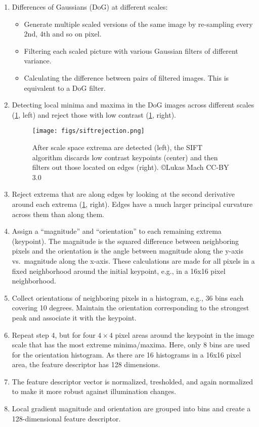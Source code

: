 \begin{enumerate}
\item Differences of Gaussians (DoG) at different scales:
\begin{itemize}
\item Generate multiple scaled versions of the same image by re-sampling every 2nd, 4th and so on pixel.
\item Filtering each scaled picture with various Gaussian filters of different variance.
\item Calculating the difference between pairs of filtered images. This is equivalent to a DoG filter.
\end{itemize}

\item Detecting local minima and maxima in the DoG images across different scales (\cref{fig:siftrejection}, left) and reject those with low contrast (\cref{fig:siftrejection}, right).

\begin{figure}
	\centering
	\texttt{[image: figs/siftrejection.png]}
	\caption{After scale space extrema are detected (left), the SIFT algorithm discards low contrast keypoints (center) and then filters out those located on edges (right). \copyright Lukas Mach CC-BY 3.0}
	\label{fig:siftrejection}
\end{figure}

\item Reject extrema that are along edges by looking at the second derivative around each extrema (\cref{fig:siftrejection}, right). Edges have a much larger principal curvature across them than along them.
\item Assign a ``magnitude'' and ``orientation'' to each remaining extrema (keypoint). The magnitude is the squared difference between neighboring pixels and the orientation is the angle between magnitude along the y-axis vs.\ magnitude along the x-axis. These calculations are made for all pixels in a fixed neighborhood around the initial keypoint, e.g., in a 16x16 pixel neighborhood.
\item Collect orientations of neighboring pixels in a histogram, e.g., 36 bins each covering 10 degrees. Maintain the orientation corresponding to the strongest peak and associate it with the keypoint.
\item Repeat step 4, but for four $4\times4$ pixel areas around the keypoint in the image scale that has the most extreme minima/maxima. Here, only 8 bins are used for the orientation histogram. As there are 16 histograms in a 16x16 pixel area, the feature descriptor has 128 dimensions.
\item The feature descriptor vector is normalized, tresholded, and again normalized to make it more robust against illumination changes.
\item Local gradient magnitude and orientation are grouped into bins and create a 128-dimensional feature descriptor.
\end{enumerate}

